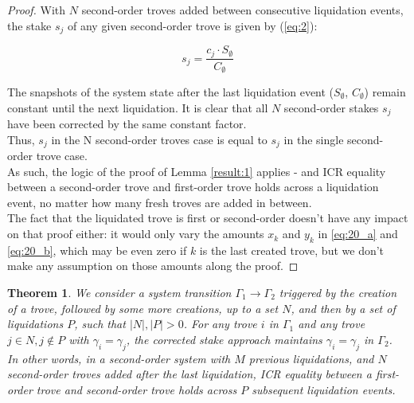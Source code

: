\documentclass[reqno]{article}
\newtheorem{theorem}{Theorem}[section]
\begin{document}
\begin{proof}
With $N$ second-order troves added between consecutive liquidation events, the stake $s_j$ of any given second-order trove is given by (\ref{eq:2}):

\begin{equation} 
    s_j=\frac{c_j \cdot S_\emptyset}{C_\emptyset}
\end{equation}

\bigskip
The snapshots of the system state after the last liquidation event ($S_\emptyset$, $C_\emptyset$) remain constant until the next liquidation. It is clear that all $N$ second-order stakes $s_j$ have been corrected by the same constant factor.\\

Thus, $s_j$ in the N second-order troves case is equal to $s_j$ in the single second-order trove case.\\

As such, the logic of the proof of Lemma \ref{result:1} applies - and ICR equality between a second-order trove and first-order trove holds across a liquidation event, no matter how many fresh troves are added in between.\\
The fact that the liquidated trove is first or second-order doesn’t have any impact on that proof either: it would only vary the amounts $x_k$ and $y_k$ in \ref{eq:20_a} and \ref{eq:20_b}, which may be even zero if $k$ is the last created trove, but we don’t make any assumption on those amounts along the proof.
\end{proof}

\begin{theorem} \label{result:4}
We consider a system transition $\Gamma_1 \rightarrow \Gamma_2$ triggered by the creation of a trove, followed by some more creations, up to a set $N$, and then by a set of liquidations $P$, such that $|N|, |P| > 0$. For any trove $i$ in $\Gamma_1$ and any trove $j \in N, j\notin P$ with $\gamma_i = \gamma_j$, the corrected stake approach maintains $\gamma_i = \gamma_j$ in $\Gamma_2$. \\
In other words, in a second-order system with $M$ previous liquidations, and $N$ second-order troves added after the last liquidation, ICR equality between a first-order trove and second-order trove holds across $P$ subsequent liquidation events.
\end{theorem}
\end{document}
